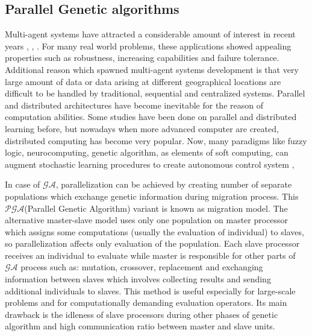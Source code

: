 \subsection{Parallel Genetic algorithms}
\label{cha:ParallelGeneticAlgorithm}
Multi-agent systems have attracted a considerable amount of interest in recent
years \cite{bib17}, \cite{bib21}, \cite{bib22}. For many real world problems, 
these applications showed appealing properties such as robustness, 
increasing capabilities and failure tolerance. Additional reason which spawned
multi-agent systems development is that very large amount of data or data arising at 
different geographical locations are difficult to be handled by traditional, 
sequential and centralized systems. Parallel and distributed architectures have
become inevitable for the reason of computation abilities. Some 
studies have been done on parallel and distributed learning before, but nowadays
when more advanced computer are created, distributed computing has become very
popular. Now, many paradigms like fuzzy logic, neurocomputing, 
genetic algorithm, as elements of soft computing, can augment stochastic
learning procedures to create autonomous control system \cite{bib2}, \cite{bib4}

In case of $\mathcal{GA}$, parallelization can be achieved by creating number of 
separate populations which exchange genetic information during migration
process. This $\mathcal{PGA}$(Parallel Genetic Algorithm) variant is known as migration 
model. The alternative master-slave model uses only one population on master processor
which assigns some computations (usually the evaluation of individual) to
slaves, so parallelization affects only evaluation of the population. Each slave processor
receives an individual to evaluate while master is responsible for other parts of $\mathcal{GA}$ process
such as: mutation, crossover, replacement and exchanging information between slaves
which involves collecting results and sending additional individuals to slaves. This method is useful 
especially for large-scale problems and for computationally demanding evaluation operators. 
Its main drawback is the idleness of slave processors during other phases of
genetic algorithm and high communication ratio between master and slave units. 

